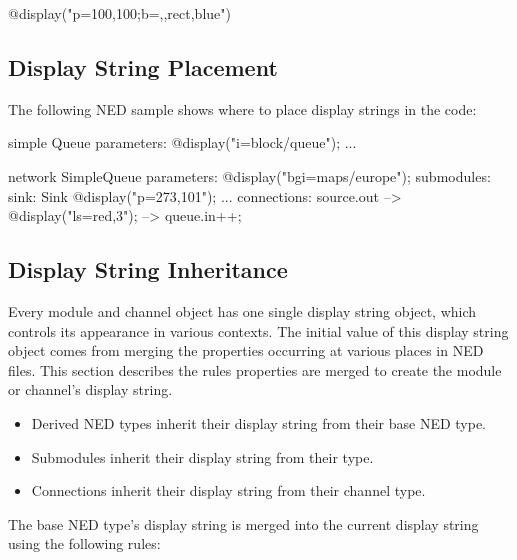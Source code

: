 \begin{ned}
@display("p=100,100;b=,,rect,blue")
\end{ned}

\subsection{Display String Placement}

The following NED sample shows where to place display strings in the code:

\begin{ned}
simple Queue
{
    parameters:
        @display("i=block/queue");
    ...
}

network SimpleQueue
{
    parameters:
        @display("bgi=maps/europe");
    submodules:
        sink: Sink {
            @display("p=273,101");
        }
        ...
    connections:
        source.out --> { @display("ls=red,3"); } --> queue.in++;
}
\end{ned}

\subsection{Display String Inheritance}

Every module and channel object has one single display string object,
which controls its appearance in various contexts. The initial value of
this display string object comes from merging the 
properties occurring at various places in NED files.
This section describes the rules  properties are merged
to create the module or channel's display string.

\begin{itemize}
  \item Derived NED types inherit their display string from their base NED type.
  \item Submodules inherit their display string from their type.
  \item Connections inherit their display string from their channel type.
\end{itemize}

The base NED type's display string is merged into the current display string
using the following rules:

